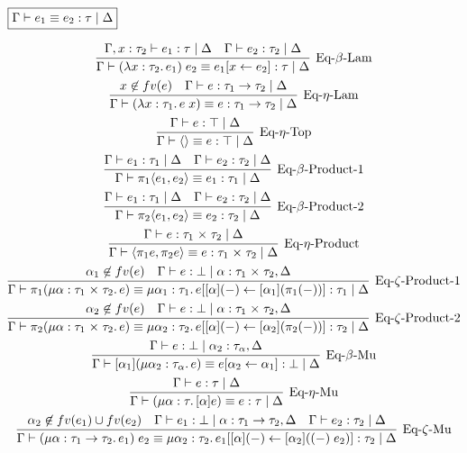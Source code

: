 $\fbox{$\Gamma \vdash e_1 \equiv e_2: \tau \mid \Delta$}$

\begin{gather*}
  \infer[\text{Eq-$\beta$-Lam}]{\Gamma \vdash (\lambda x: \tau_2\ldotp e_1)\; e_2 \equiv e_1[x \assign e_2]: \tau \mid \Delta}{
    \Gamma, x: \tau_2 \vdash e_1: \tau \mid \Delta
    &
    \Gamma \vdash e_2: \tau_2 \mid \Delta
  }
  \\
  \infer[\text{Eq-$\eta$-Lam}]{\Gamma \vdash (\lambda x: \tau_1\ldotp e\; x) \equiv e: \tau_1 \to \tau_2 \mid \Delta}{
    x \not\in \freevar(e)
    &
    \Gamma \vdash e: \tau_1 \to \tau_2 \mid \Delta
  }
  \\
  \infer[\text{Eq-$\eta$-Top}]{\Gamma \vdash \langle\rangle \equiv e: \top \mid \Delta}{
    \Gamma \vdash e: \top \mid \Delta
  }
  \\
  \infer[\text{Eq-$\beta$-Product-1}]{\Gamma \vdash \pi_1\langle e_1, e_2\rangle \equiv e_1: \tau_1 \mid \Delta}{
    \Gamma \vdash e_1: \tau_1 \mid \Delta
    &
    \Gamma \vdash e_2: \tau_2 \mid \Delta
  }
  \\
  \infer[\text{Eq-$\beta$-Product-2}]{\Gamma \vdash \pi_2\langle e_1, e_2\rangle \equiv e_2: \tau_2 \mid \Delta}{
    \Gamma \vdash e_1: \tau_1 \mid \Delta
    &
    \Gamma \vdash e_2: \tau_2 \mid \Delta
  }
  \\
  \infer[\text{Eq-$\eta$-Product}]{\Gamma \vdash \langle \pi_1 e, \pi_2 e\rangle \equiv e: \tau_1 \multi \tau_2 \mid \Delta}{
    \Gamma \vdash e: \tau_1 \multi \tau_2 \mid \Delta
  }
  \\
  \infer[\text{Eq-$\zeta$-Product-1}]{\Gamma \vdash \pi_1 (\mu \alpha: \tau_1 \multi \tau_2\ldotp e) \equiv \mu \alpha_1: \tau_1\ldotp e[[\alpha](-) \assign [\alpha_1](\pi_1 (-))]: \tau_1 \mid \Delta}{
    \alpha_1 \not\in \freevar(e)
    &
    \Gamma \vdash e: \bot \mid \alpha: \tau_1 \multi \tau_2, \Delta
  }
  \\
  \infer[\text{Eq-$\zeta$-Product-2}]{\Gamma \vdash \pi_2 (\mu \alpha: \tau_1 \multi \tau_2\ldotp e) \equiv \mu \alpha_2: \tau_2\ldotp e[[\alpha](-) \assign [\alpha_2](\pi_2 (-))]: \tau_2 \mid \Delta}{
    \alpha_2 \not\in \freevar(e)
    &
    \Gamma \vdash e: \bot \mid \alpha: \tau_1 \multi \tau_2, \Delta
  }
  \\
  \infer[\text{Eq-$\beta$-Mu}]{\Gamma \vdash [\alpha_1](\mu \alpha_2: \tau_\alpha\ldotp e) \equiv e[\alpha_2 \assign \alpha_1]: \bot \mid \Delta}{
    \Gamma \vdash e: \bot \mid \alpha_2: \tau_\alpha, \Delta
  }
  \\
  \infer[\text{Eq-$\eta$-Mu}]{\Gamma \vdash (\mu \alpha: \tau\ldotp [\alpha]e) \equiv e: \tau \mid \Delta}{
    \Gamma \vdash e: \tau \mid \Delta
  }
  \\
  \infer[\text{Eq-$\zeta$-Mu}]{\Gamma \vdash (\mu \alpha: \tau_1 \to \tau_2\ldotp e_1)\; e_2 \equiv \mu \alpha_2: \tau_2\ldotp e_1[[\alpha](-) \assign [\alpha_2]((-)\; e_2)]: \tau_2 \mid \Delta}{
    \alpha_2 \not\in \freevar(e_1) \cup \freevar(e_2)
    &
    \Gamma \vdash e_1: \bot \mid \alpha: \tau_1 \to \tau_2, \Delta
    &
    \Gamma \vdash e_2: \tau_2 \mid \Delta
  }
\end{gather*}

